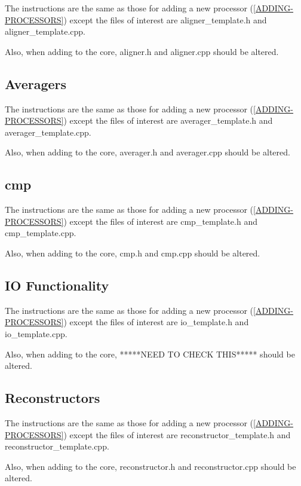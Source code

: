   The instructions are the same as those for adding a new processor
  (\ref{ADDING-PROCESSORS}) except the files of interest are
  aligner\_template.h and aligner\_template.cpp.

  Also, when adding to the core, aligner.h and aligner.cpp should be altered.

\subsection{Averagers}
  \label{ADDING-AVERAGERS}

  The instructions are the same as those for adding a new processor
  (\ref{ADDING-PROCESSORS}) except the files of interest are
  averager\_template.h and averager\_template.cpp.

  Also, when adding to the core, averager.h and averager.cpp should be altered.

\subsection{cmp}
  \label{ADDING-CMP} 

  The instructions are the same as those for adding a new processor
  (\ref{ADDING-PROCESSORS}) except the files of interest are
  cmp\_template.h and cmp\_template.cpp.

  Also, when adding to the core, cmp.h and cmp.cpp should be altered.


\subsection{IO Functionality}
  \label{ADDING-IO} 

  The instructions are the same as those for adding a new processor
  (\ref{ADDING-PROCESSORS}) except the files of interest are
  io\_template.h and io\_template.cpp.

  Also, when adding to the core, *****NEED TO CHECK THIS***** should be altered.


\subsection{Reconstructors}
  \label{ADDING-RECONSTRUCTORS} 
  
  The instructions are the same as those for adding a new processor
  (\ref{ADDING-PROCESSORS}) except the files of interest are
  reconstructor\_template.h and reconstructor\_template.cpp.

  Also, when adding to the core, reconstructor.h and reconstructor.cpp should be altered.
